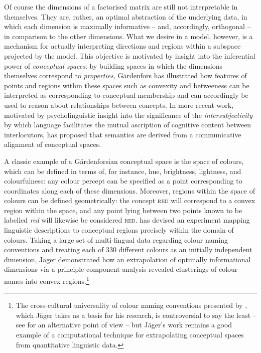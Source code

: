 Of course the dimensions of a factorised matrix are still not interpretable in themselves.  They are, rather, an optimal abstraction of the underlying data, in which each dimension is maximally informative -- and, accordingly, orthogonal -- in comparison to the other dimensions.  What we desire in a model, however, is a mechanism for actually interpreting directions and regions within a subspace projected by the model.  This objective is motivated by  insight into the inferential power of \emph{conceptual spaces}: by building spaces in which the dimensions themselves correspond to \emph{properties}, G\"{a}rdenfors has illustrated how features of points and regions within these spaces such as convexity and betweeness can be interpreted as corresponding to conceptual membership and can accordingly be used to reason about relationships between concepts.  In more recent work, motivated by psycholinguistic insight into the significance of the \emph{intersubjectivity} by which language facilitates the mutual ascription of cognitive content between interlocutors, \cite{Gardenfors2014} has proposed that semantics are derived from a communicative alignment of conceptual spaces.

A classic example of a G\"{a}rdenforsian conceptual space is the space of colours, which can be defined in terms of, for instance, hue, brightness, lightness, and colourfulness: any colour percept can be specified as a point corresponding to coordinates along each of these dimensions.  Moreover, regions within the space of colours can be defined geometrically: the concept \textsc{red} will correspond to a convex region within the space, and any point lying between two points known to be labelled \emph{red} will likewise be considered \textsc{red}.  \cite{Jager2010} has devised an experiment mapping linguistic descriptions to conceptual regions precisely within the domain of colours.  Taking a large set of multi-lingual data regarding colour naming conventions and treating each of 330 different colours as an initially independent dimension, J\"{a}ger demonstrated how an extrapolation of optimally informational dimensions via a principle component analysis revealed clusterings of colour names into convex regions.\footnote{The cross-cultural universality of colour naming conventions presented by \cite{KayEA1999}, which J\"{a}ger takes as a basis for his research, is controversial to say the least -- see \cite{Levinson2001} for an alternative point of view -- but J\"{a}ger's work remains a good example of a computational technique for extrapolating conceptual spaces from quantitative linguistic data.}

